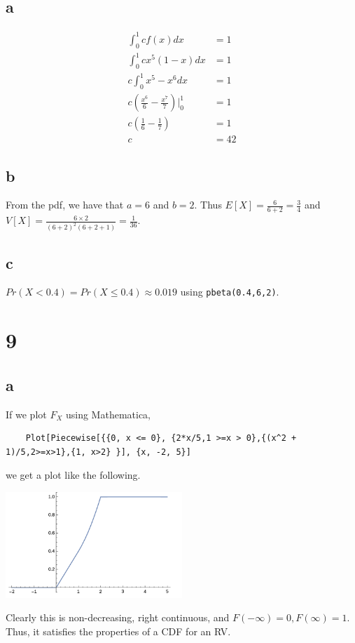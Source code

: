 \documentclass[10pt]{article}
\begin{document}
\subsection*{a}
\begin{align*}
    \int_0^1cf(x)dx&=1\\
    \int_0^1cx^5(1-x)dx&=1\\
    c\int_0^1x^5-x^6dx&=1\\
    c\left (\frac{x^6}{6}-\frac{x^7}{7}\right )\Bigr |_0^1&=1\\
    c(\frac{1}{6}-\frac{1}{7})&=1\\
    c&=42
\end{align*}
\subsection*{b}
From the pdf, we have that $a=6$ and $b=2.$ Thus $E[X]=\frac{6}{6+2}=\frac{3}{4}$ and $V[X]=\frac{6\times2}{(6+2)^2(6+2+1)}=\frac{1}{36}.$
\subsection*{c}
$Pr(X<0.4)=Pr(X\le0.4)\approx0.019$ using \texttt{pbeta(0.4,6,2)}.

\section*{9}
\subsection*{a}
If we plot $F_X$ using Mathematica,
\begin{verbatim}
    Plot[Piecewise[{{0, x <= 0}, {2*x/5,1 >=x > 0},{(x^2 + 1)/5,2>=x>1},{1, x>2} }], {x, -2, 5}]\end{verbatim}
    we get a plot like the following.
    \begin{center}
        \includegraphics[width=0.5\textwidth]{hw7_9.png}
    \end{center}

Clearly this is non-decreasing, right continuous, and $F(-\infty)=0, F(\infty)=1.$ Thus, it satisfies the properties of a CDF for an RV.
\end{document}
